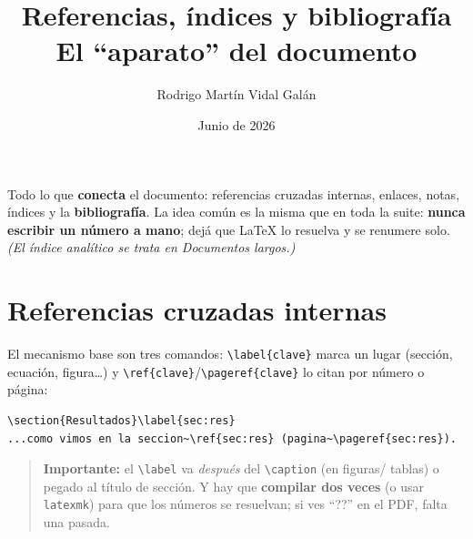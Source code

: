 \documentclass[11pt,a4paper]{article}
\title{\textbf{Referencias, índices y bibliografía}\\[2pt]
       \large El \enquote{aparato} del documento}
\author{Rodrigo Martín Vidal Galán}
\date{Junio de 2026}
\newcommand{\C}[1]{\texttt{\textbackslash #1}}
\begin{document}
\maketitle

\noindent Todo lo que \textbf{conecta} el documento: referencias cruzadas
internas, enlaces, notas, índices y la \textbf{bibliografía}. La idea común es la
misma que en toda la suite: \textbf{nunca escribir un número a mano}; dejá que
\LaTeX{} lo resuelva y se renumere solo. \emph{(El índice analítico se trata en
\emph{Documentos largos}.)}

\newpage
\tableofcontents
\newpage

\section{Referencias cruzadas internas}
El mecanismo base son tres comandos: \C{label\{clave\}} marca un lugar (sección,
ecuación, figura\dots) y \C{ref\{clave\}}/\C{pageref\{clave\}} lo citan por
número o página:
\begin{lstlisting}
\section{Resultados}\label{sec:res}
...como vimos en la seccion~\ref{sec:res} (pagina~\pageref{sec:res}).
\end{lstlisting}
\begin{quote}\small
\textbf{Importante:} el \C{label} va \emph{después} del \C{caption} (en figuras/
tablas) o pegado al título de sección. Y hay que \textbf{compilar dos veces}
(o usar \texttt{latexmk}) para que los números se resuelvan; si ves \enquote{??}
en el PDF, falta una pasada.
\end{quote}
\end{document}
